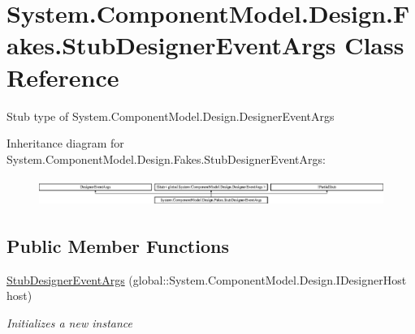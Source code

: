 \hypertarget{class_system_1_1_component_model_1_1_design_1_1_fakes_1_1_stub_designer_event_args}{\section{System.\-Component\-Model.\-Design.\-Fakes.\-Stub\-Designer\-Event\-Args Class Reference}
\label{class_system_1_1_component_model_1_1_design_1_1_fakes_1_1_stub_designer_event_args}
}


Stub type of System.\-Component\-Model.\-Design.\-Designer\-Event\-Args 


Inheritance diagram for System.\-Component\-Model.\-Design.\-Fakes.\-Stub\-Designer\-Event\-Args\-:\begin{figure}[H]
\begin{center}
\leavevmode
\includegraphics[height=0.912795cm]{class_system_1_1_component_model_1_1_design_1_1_fakes_1_1_stub_designer_event_args}
\end{center}
\end{figure}
\subsection*{Public Member Functions}
\begin{DoxyCompactItemize}
\item 
\hyperlink{class_system_1_1_component_model_1_1_design_1_1_fakes_1_1_stub_designer_event_args_a494967fd2e0923453a89cc8d5acbe847}{Stub\-Designer\-Event\-Args} (global\-::\-System.\-Component\-Model.\-Design.\-I\-Designer\-Host host)
\begin{DoxyCompactList}\small\item\em Initializes a new instance\end{DoxyCompactList}\end{DoxyCompactItemize}
